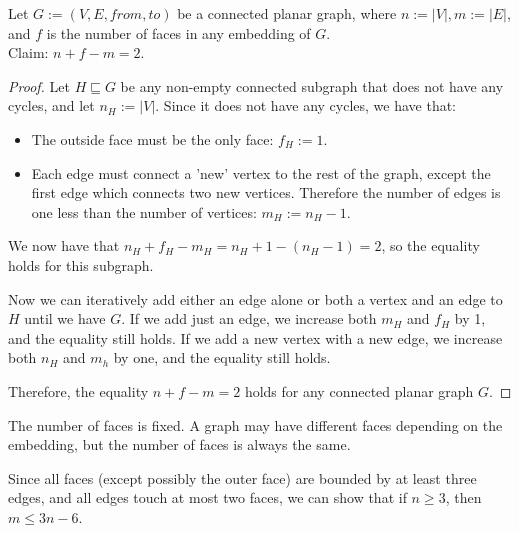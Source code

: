 \begin{theorem}
    Let $G := (V, E, from, to)$ be a connected planar graph, where $n := |V|, m := |E|$, and $f$ is the number of faces in any embedding of $G$. \\
    Claim: $n + f - m = 2$.

    \begin{proof}
        Let $H \sqsubseteq G$ be any non-empty connected subgraph that does not have any cycles, and let $n_H := |V|$. Since it does not have any cycles, we have that:
        \begin{itemize}
            \item The outside face must be the only face: $f_H := 1$.
            \item Each edge must connect a 'new' vertex to the rest of the graph, except the first edge which connects two new vertices. Therefore the number of edges is one less than the number of vertices: $m_H := n_H - 1$.
        \end{itemize}
        We now have that $n_H + f_H - m_H = n_H + 1 - (n_H-1) = 2$, so the equality holds for this subgraph.

        Now we can iteratively add either an edge alone or both a vertex and an edge to $H$ until we have $G$. If we add just an edge, we increase both $m_H$ and $f_H$ by 1, and the equality still holds. If we add a new vertex with a new edge, we increase both $n_H$ and $m_h$ by one, and the equality still holds. 
        
        Therefore, the equality $n + f - m = 2$ holds for any connected planar graph $G$.
    \end{proof}
\end{theorem}

\begin{corollary}
    The number of faces is fixed. A graph may have different faces depending on the embedding, but the number of faces is always the same.
\end{corollary}
    
\begin{corollary}
    \label{corollary:m-leq-3n}
    Since all faces (except possibly the outer face) are bounded by at least three edges, and all edges touch at most two faces, we can show that if $n \geq 3$, then $m \leq 3n-6$.
\end{corollary}

    
